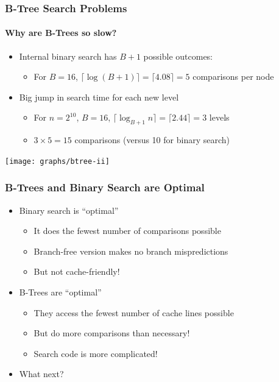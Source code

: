 \documentclass[xcolor=dvipsnames]{beamer}
\begin{document}
\begin{frame}
   \frametitle{B-Tree Search Problems}
   \framesubtitle{Why are B-Trees so slow?}
    
   \begin{itemize}
      \item<+->Internal binary search has $B+1$ possible outcomes:
      \begin{itemize}
        \item<+->For $B=16$, 
                  $\lceil\log(B+1)\rceil = \lceil 4.08\rceil = 5$ comparisons per node
      \end{itemize}
      \item<+->Big jump in search time for each new level 
      \begin{itemize}
        \item<+->For $n=2^{10}$, $B=16$, 
                  $\lceil\log_{B+1}n\rceil = \lceil 2.44\rceil = 3$ levels
        \item<+->$3\times 5 = 15$ comparisons (versus 10 for binary search)
      \end{itemize}
   \end{itemize}
   \begin{center}
      \texttt{[image: graphs/btree-ii]}
   \end{center}
\end{frame}


\begin{frame}
   \frametitle{B-Trees and Binary Search are Optimal}

   \begin{itemize}
     \item<+-> Binary search is ``optimal''
     \begin{itemize}
       \item It does the fewest number of comparisons possible
       \item Branch-free version makes no branch mispredictions
       \item But not cache-friendly!
     \end{itemize}
     \item<+-> B-Trees are ``optimal''
     \begin{itemize}
       \item They access the fewest number of cache lines possible
       \item But do more comparisons than necessary!
       \item Search code is more complicated!
     \end{itemize}
     \item<+-> What next?
   \end{itemize}
\end{frame}
\end{document}
